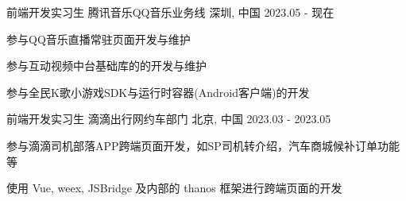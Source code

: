 

\begin{cventries}
    \cventry
    {前端开发实习生} %
    {腾讯音乐\hspace{2mm}QQ音乐业务线} %
    {深圳, 中国} %
    {2023.05 - 现在} %
    {
        \begin{cvitems} %
            \item {参与QQ音乐直播常驻页面开发与维护}
            \item {参与互动视频中台基础库的的开发与维护}
            \item {参与全民K歌小游戏SDK与运行时容器(Android客户端)的开发}
        \end{cvitems}
    }

    \cventry
    {前端开发实习生} %
    {滴滴出行\hspace{2mm}网约车部门} %
    {北京, 中国} %
    {2023.03 - 2023.05} %
    {
        \begin{cvitems} %
            \item {参与滴滴司机部落APP跨端页面开发，如SP司机转介绍，汽车商城候补订单功能等}
            \item {使用 Vue, weex, JSBridge 及内部的 thanos 框架进行跨端页面的开发}
        \end{cvitems}
    }
\end{cventries}
